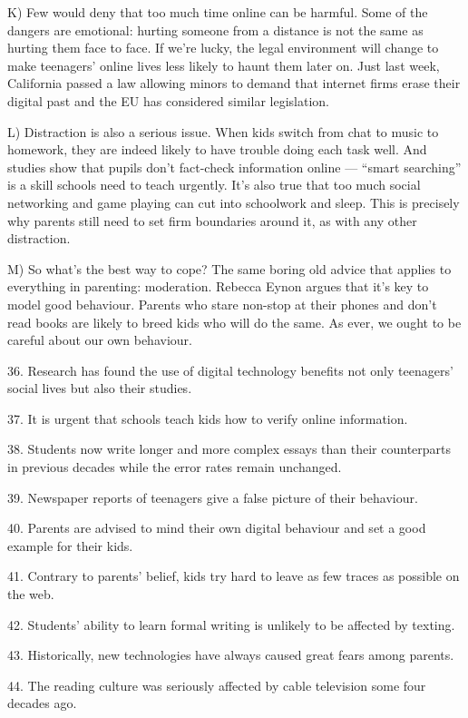 \documentclass[UTF8,11pt]{ctexart}
\begin{document}
K) Few would deny that too much time online can be harmful. Some of the dangers are emotional: hurting someone from a distance is not the same as hurting them face to face. If we’re lucky, the legal environment will change to make teenagers’ online lives less likely to haunt them later on. Just last week, California passed a law allowing minors to demand that internet firms erase their digital past and the EU has considered similar legislation.


L) Distraction is also a serious issue. When kids switch from chat to music to homework, they are indeed likely to have trouble doing each task well. And studies show that pupils don’t fact-check information online — “smart searching” is a skill schools need to teach urgently. It’s also true that too much social networking and game playing can cut into schoolwork and sleep. This is precisely why parents still need to set firm boundaries around it, as with any other distraction.


M) So what’s the best way to cope? The same boring old advice that applies to everything in parenting: moderation. Rebecca Eynon argues that it’s key to model good behaviour. Parents who stare non-stop at their phones and don’t read books are likely to breed kids who will do the same. As ever, we ought to be careful about our own behaviour.


36. Research has found the use of digital technology benefits not only teenagers’ social lives but also their studies.


37. It is urgent that schools teach kids how to verify online information.


38. Students now write longer and more complex essays than their counterparts in previous decades while the error rates remain unchanged.


39. Newspaper reports of teenagers give a false picture of their behaviour.


40. Parents are advised to mind their own digital behaviour and set a good example for their kids.


41. Contrary to parents’ belief, kids try hard to leave as few traces as possible on the web.


42. Students’ ability to learn formal writing is unlikely to be affected by texting.


43. Historically, new technologies have always caused great fears among parents.


44. The reading culture was seriously affected by cable television some four decades ago.
\end{document}
